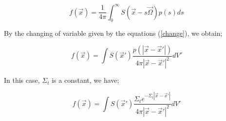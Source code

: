\documentclass[a4paper, 12pt]{report}
\begin{document}
\begin{appendix}
\begin{equation}
f(\vec{x}) = \frac{1}{4\pi} \int_0^\infty S(\vec{x}-s\vec{\Omega}) p(s) ds
\end{equation}

By the changing of variable given by the equations (\ref{change}), we obtain;

\begin{equation}
f(\vec{x}) = \int S(\vec{x}') \frac{p(|\vec{x}-\vec{x}'|)}{4\pi|\vec{x}-\vec{x}'|^2}dV'
\end{equation}

In this case, $\Sigma_t$ is a constant, we have;

\begin{equation}
f(\vec{x}) = \int S(\vec{x}') \frac{\Sigma_t e^{-\Sigma_t|\vec{x}-\vec{x}'|}}{4\pi|\vec{x}-\vec{x}'|^2}dV'
\end{equation}
\end{appendix}
\end{document}
